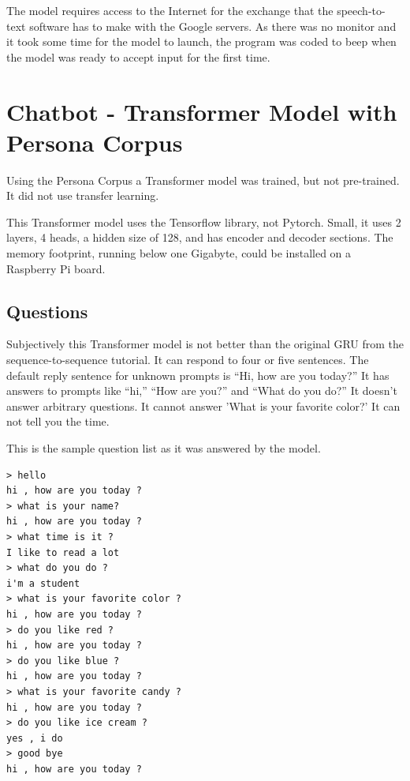 The model requires access to the Internet for the exchange that the speech-to-text software has to make with the Google servers. As there was no monitor and it took some time for the model to launch, the program was coded to beep when the model was ready to accept input for the first time.

\section{Chatbot - Transformer Model with Persona Corpus}
\label{transformer-persona-corpus}
Using the Persona Corpus a Transformer model was trained, but not pre-trained. It did not use transfer learning. %

This Transformer model uses the Tensorflow library, not Pytorch. Small, it uses 2 layers, 4 heads, a hidden size of 128, and has encoder and decoder sections. The memory footprint, running below one Gigabyte, could be installed on a Raspberry Pi board. %


\subsection{Questions}
Subjectively this Transformer model is not better than the original GRU from the sequence-to-sequence tutorial. It can respond to four or five sentences. The default reply sentence for unknown prompts is ``Hi, how are you today?'' It has answers to prompts like ``hi,'' ``How are you?'' and ``What do you do?'' It doesn't answer arbitrary questions. It cannot answer 'What is your favorite color?' It can not tell you the time. 

This is the sample question list as it was answered by the model.

\begin{verbatim}
> hello
hi , how are you today ?
> what is your name?
hi , how are you today ?
> what time is it ?
I like to read a lot
> what do you do ?
i'm a student
> what is your favorite color ?
hi , how are you today ?
> do you like red ?
hi , how are you today ?
> do you like blue ?
hi , how are you today ?
> what is your favorite candy ?
hi , how are you today ?
> do you like ice cream ?
yes , i do 
> good bye
hi , how are you today ?
\end{verbatim}

